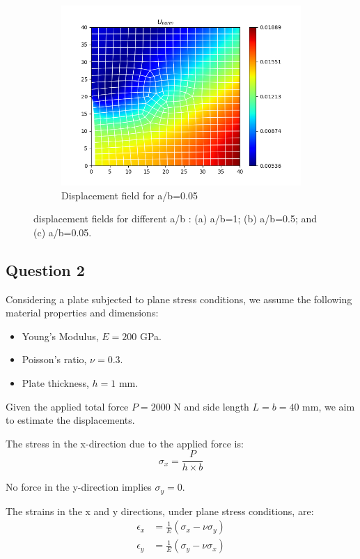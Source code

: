 \documentclass[twoside,twocolumn,10pt]{article}
\begin{document}
\begin{figure}[!ht]
\begin{subfigure}[c]{0.32\textwidth}
    \centering
    \includegraphics[width=1.\linewidth]{Q2_1/Q1_0.05_2_quad.png}
    \caption{Displacement field for a/b=0.05}
    \label{fig:disp_005}
  \end{subfigure}
  \caption{ displacement fields for different a/b : (a) a/b=1; (b) a/b=0.5; and (c) a/b=0.05.}
  \label{fig:disp}  
\end{figure} 

\subsection{Question 2}
Considering a plate subjected to plane stress conditions, we assume the following material properties and dimensions:
\begin{itemize}
    \item Young's Modulus, \( E = 200 \) GPa.
    \item Poisson's ratio, \( \nu = 0.3 \).
    \item Plate thickness, \( h = 1 \) mm.
\end{itemize}
Given the applied total force \( P = 2000 \) N and side length \( L = b = 40 \) mm, we aim to estimate the displacements.

The stress in the x-direction due to the applied force is:
\begin{equation}
\sigma_x = \frac{P}{h \times b}
\end{equation}

No force in the y-direction implies \( \sigma_y = 0 \).

The strains in the x and y directions, under plane stress conditions, are:
\begin{equation}
\begin{aligned}
\epsilon_x &= \frac{1}{E} (\sigma_x - \nu \sigma_y) \\
\epsilon_y &= \frac{1}{E} (\sigma_y - \nu \sigma_x)
\end{aligned}
\end{equation}
\end{document}

